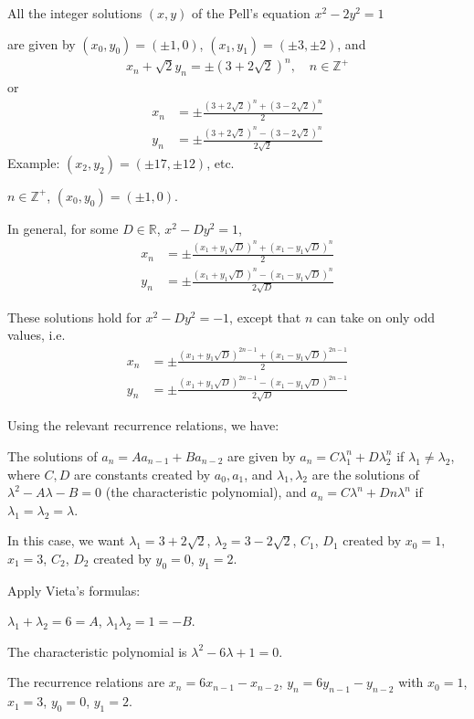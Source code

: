 All the integer solutions $(x,y)$ of the Pell's equation $x^2-2y^2=1$

are given by $(x_{0},y_{0})=(\pm 1,0)$, $(x_{1},y_{1})=(\pm 3,\pm 2)$,
and 
\begin{align*}
x_{n}+\sqrt{2}y_{n} = \pm(3+2\sqrt{2})^n, 
\quad n\in\mathbb Z^+
\end{align*}
or 
\begin{align*}
x_{n} & = \pm\frac{(3+2\sqrt{2})^n+(3-2\sqrt{2})^n}{2}
\\
y_{n} & = \pm\frac{(3+2\sqrt{2})^n-(3-2\sqrt{2})^n}{2\sqrt{2}}
\end{align*}
Example: $(x_{2},y_{2})=(\pm 17,\pm 12)$, etc.

$n\in\mathbb Z^+$, $(x_{0},y_{0})=(\pm 1,0)$.

In general, for some $D\in\mathbb{R}$, $x^2-Dy^2=1$,
\begin{align*}
x_{n} & = \pm\frac{(x_{1}+y_{1}\sqrt{D})^n+(x_{1}-y_{1}\sqrt{D})^n}{2}
\\
y_{n} & = \pm\frac{(x_{1}+y_{1}\sqrt{D})^n-(x_{1}-y_{1}\sqrt{D})^n}{2\sqrt{D}}
\end{align*}

These solutions hold for $x^2-Dy^2=-1$, except that $n$ can take on only odd values, i.e.
\begin{align*}
x_{n} & =\pm\frac{(x_{1}+y_{1}\sqrt{D})^{2n-1}+(x_{1}-y_{1}\sqrt{D})^{2n-1}}{2}
\\
y_{n} & =\pm\frac{(x_{1}+y_{1}\sqrt{D})^{2n-1}-(x_{1}-y_{1}\sqrt{D})^{2n-1}}{2\sqrt{D}}
\end{align*}

Using the relevant recurrence relations, we have:

The solutions of $a_{n}=Aa_{n-1}+Ba_{n-2}$ are given by $a_{n}=C\lambda_{1}^n+D\lambda_{2}^n$ if $\lambda_{1}\neq \lambda_{2}$, where $C,D$ are constants created by $a_{0},a_{1}$, and $\lambda_{1}, \lambda_{2}$ are the solutions of $\lambda^2-A\lambda-B=0$ (the characteristic polynomial), and $a_{n}=C\lambda^n+Dn\lambda^n$ if $\lambda_{1}=\lambda_{2}=\lambda$.

In this case, we want $\lambda_{1}=3+2\sqrt{2}$, $\lambda_{2}=3-2\sqrt{2}$, $C_{1}$, $D_{1}$ created by $x_{0}=1$, $x_{1}=3$, $C_{2}$, $D_{2}$ created by $y_{0}=0$, $y_{1}=2$.

Apply Vieta's formulas:

$\lambda_{1}+\lambda_{2}=6=A$, $\lambda_{1}\lambda_{2}=1=-B$.

The characteristic polynomial is $\lambda^2-6\lambda+1=0$.

The recurrence relations are $x_{n}=6x_{n-1}-x_{n-2}$, $y_{n}=6y_{n-1}-y_{n-2}$ with $x_{0}=1$, $x_{1}=3$, $y_{0}=0$, $y_{1}=2$.

